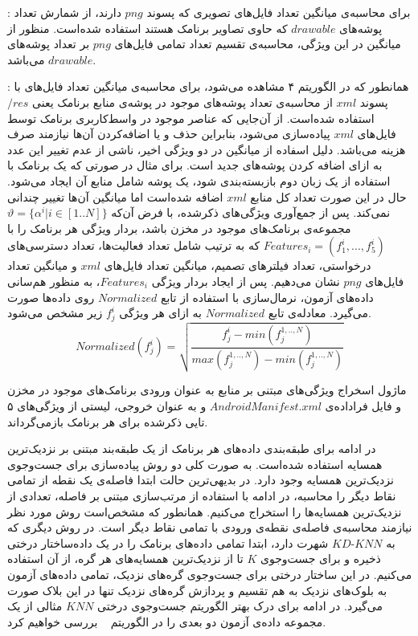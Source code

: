 : برای محاسبه‌ی میانگین تعداد فایل‌های تصویری که پسوند $png$ دارند، از شمارش تعداد پوشه‌های $drawable$ که حاوی تصاویر برنامک هستند استفاده شده‌است. منظور از میانگین در این ویژگی، محاسبه‌ی تقسیم تعداد تمامی فایل‌های $png$ بر تعداد پوشه‌های $drawable$ می‌باشد.

:  همانطور که در الگوریتم ۴ مشاهده می‌شود، برای محاسبه‌ی میانگین تعداد فایل‌های با پسوند $xml$ از محاسبه‌ی تعداد پوشه‌های موجود در پوشه‌ی منابع برنامک یعنی $/res$ استفاده شده‌است. از آن‌جایی که عناصر موجود در واسط‌کاربری برنامک توسط فایل‌های $xml$ پیاده‌سازی می‌شود، بنابراین حذف و یا اضافه‌کردن آن‌ها نیازمند صرف هزینه می‌باشد. دلیل اسفاده از میانگین در دو ویژگی اخیر، ناشی از عدم تغییر این عدد به ازای اضافه کردن پوشه‌های جدید است. برای مثال در صورتی که یک برنامک با استفاده از یک زبان دوم بازبسته‌بندی شود، یک پوشه‌ شامل منابع آن ایجاد می‌شود. حال در این صورت تعداد کل منابع $xml$ اضافه شده‌است اما میانگین آن‌ها تغییر چندانی نمی‌کند.
پس از جمع‌آوری ویژگی‌های ذکر‌شده، با فرض آن‌که $ \vartheta =\{\alpha^i | i \in [1..N]\}$
مجموعه‌ی برنامک‌های موجود در مخزن‌ باشد، بردار ویژگی هر برنامک را با 
$Features_{i} =(f^{i}_{1},...,f^{i}_{5})$
که به ترتیب شامل  تعداد فعالیت‌ها، تعداد دسترسی‌های درخواستی، تعداد فیلتر‌های تصمیم، میانگین تعداد فایل‌های $xml$ و میانگین تعداد فایل‌های $png$ نشان می‌دهیم. پس از ایجاد بردار ویژگی $Features_{i}$، به منظور هم‌سانی‌ داده‌های آزمون، نرمال‌سازی با استفاده از تابع $Normalized$ روی داده‌ها صورت می‌گیرد. معادله‌ی تابع $Normalized$ به ازای هر ویژگی $f^{i}_{j}$ زیر مشخص‌ می‌شود.\\
\begin{equation}
Normalized(f^{i}_{j})=\sqrt{\frac{f^{i}_{j}-min(f^{1,..,N}_{j})}{max(f^{1,..,N}_{j})-min(f^{1,..,N}_{j})}}
\end{equation}

ماژول اسخراج ویژگی‌های مبتنی بر منابع به عنوان ورودی برنامک‌های موجود در مخزن و فایل فراداده‌ی $AndroidManifest.xml$ و به عنوان خروجی، لیستی از ویژگی‌های ۵ تایی ذکرشده برای هر برنامک بازمی‌گرداند.

در ادامه برای طبقه‌بندی داده‌های هر برنامک از یک طبقه‌بند مبتنی بر نزدیک‌ترین همسایه‌ استفاده ‌شده‌است. به صورت کلی دو روش پیاده‌سازی برای جست‌و‌جوی نزدیک‌ترین همسایه وجود دارد. در بدیهی‌ترین حالت ابتدا فاصله‌ی یک نقطه از تمامی نقاط‌ دیگر را محاسبه، در ادامه با استفاده از مرتب‌سازی مبتنی بر فاصله، تعدادی از نزدیک‌ترین همسایه‌ها را استخراج می‌کنیم. همانطور که مشخص‌است روش مورد نظر نیازمند محاسبه‌ی فاصله‌ی نقطه‌ی ورودی با تمامی نقاط دیگر ‌است. در روش دیگری که به $KD\text{-}KNN$ شهرت دارد، ابتدا تمامی داده‌های برنامک را در یک داده‌ساختار درختی ذخیره و برای جست‌و‌جوی $K$ تا از نزدیک‌ترین همسایه‌های هر گره، از آن استفاده می‌کنیم. در این ساختار درختی برای جست‌و‌جوی گره‌های نزدیک، تمامی داده‌های آزمون به بلوک‌های نزدیک به هم تقسیم و پردازش گره‌های نزدیک‌ تنها در این بلاک صورت می‌گیرد. در ادامه برای درک بهتر الگوریتم جست‌و‌جوی درختی $KNN$ مثالی از یک مجموعه‌ داده‌ی آزمون دو بعدی را در الگوریتم ~ بررسی خواهیم کرد. 

